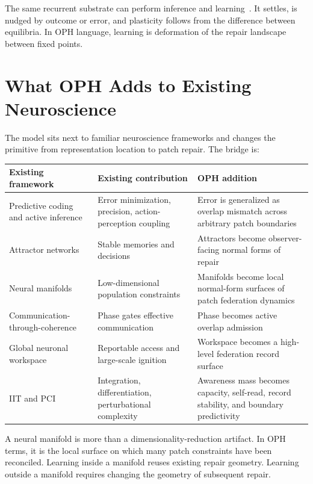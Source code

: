 \documentclass[11pt]{article}
\theoremstyle{remark}
\theoremstyle{plain}
\begin{document}
The same recurrent substrate can perform inference and learning~\cite{ScellierBengio2017}. It settles, is nudged by outcome or error, and plasticity follows from the difference between equilibria. In OPH language, learning is deformation of the repair landscape between fixed points.

\section{What OPH Adds to Existing Neuroscience}

The model sits next to familiar neuroscience frameworks and changes the primitive from representation location to patch repair. The bridge is:
\begin{small}
\begin{longtable}{@{}L{0.25\textwidth}L{0.32\textwidth}L{0.34\textwidth}@{}}
\toprule
\textbf{Existing framework} & \textbf{Existing contribution} & \textbf{OPH addition} \\
\midrule
\endhead
Predictive coding and active inference~\cite{RaoBallard1999,Friston2010} & Error minimization, precision, action-perception coupling & Error is generalized as overlap mismatch across arbitrary patch boundaries \\
Attractor networks~\cite{Hopfield1982} & Stable memories and decisions & Attractors become observer-facing normal forms of repair \\
Neural manifolds~\cite{Sadtler2014,Perich2025} & Low-dimensional population constraints & Manifolds become local normal-form surfaces of patch federation dynamics \\
Communication-through-coherence~\cite{Fries2015} & Phase gates effective communication & Phase becomes active overlap admission \\
Global neuronal workspace~\cite{DehaeneChangeux2011} & Reportable access and large-scale ignition & Workspace becomes a high-level federation record surface \\
IIT and PCI~\cite{Albantakis2023IIT,Casali2013PCI} & Integration, differentiation, perturbational complexity & Awareness mass becomes capacity, self-read, record stability, and boundary predictivity \\
\bottomrule
\end{longtable}
\end{small}

A neural manifold is more than a dimensionality-reduction artifact. In OPH terms, it is the local surface on which many patch constraints have been reconciled. Learning inside a manifold reuses existing repair geometry. Learning outside a manifold requires changing the geometry of subsequent repair.
\end{document}
